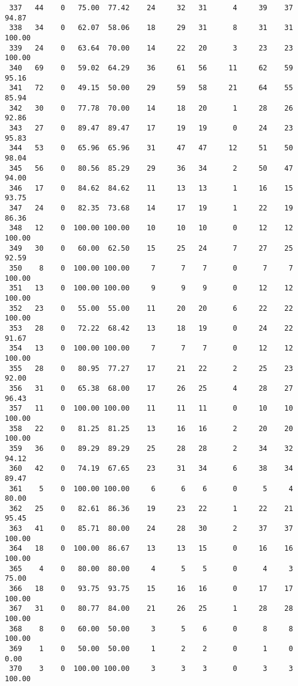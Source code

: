 \begin{verbatim}
 337   44    0   75.00  77.42    24     32   31      4     39    37    94.87
 338   34    0   62.07  58.06    18     29   31      8     31    31   100.00
 339   24    0   63.64  70.00    14     22   20      3     23    23   100.00
 340   69    0   59.02  64.29    36     61   56     11     62    59    95.16
 341   72    0   49.15  50.00    29     59   58     21     64    55    85.94
 342   30    0   77.78  70.00    14     18   20      1     28    26    92.86
 343   27    0   89.47  89.47    17     19   19      0     24    23    95.83
 344   53    0   65.96  65.96    31     47   47     12     51    50    98.04
 345   56    0   80.56  85.29    29     36   34      2     50    47    94.00
 346   17    0   84.62  84.62    11     13   13      1     16    15    93.75
 347   24    0   82.35  73.68    14     17   19      1     22    19    86.36
 348   12    0  100.00 100.00    10     10   10      0     12    12   100.00
 349   30    0   60.00  62.50    15     25   24      7     27    25    92.59
 350    8    0  100.00 100.00     7      7    7      0      7     7   100.00
 351   13    0  100.00 100.00     9      9    9      0     12    12   100.00
 352   23    0   55.00  55.00    11     20   20      6     22    22   100.00
 353   28    0   72.22  68.42    13     18   19      0     24    22    91.67
 354   13    0  100.00 100.00     7      7    7      0     12    12   100.00
 355   28    0   80.95  77.27    17     21   22      2     25    23    92.00
 356   31    0   65.38  68.00    17     26   25      4     28    27    96.43
 357   11    0  100.00 100.00    11     11   11      0     10    10   100.00
 358   22    0   81.25  81.25    13     16   16      2     20    20   100.00
 359   36    0   89.29  89.29    25     28   28      2     34    32    94.12
 360   42    0   74.19  67.65    23     31   34      6     38    34    89.47
 361    5    0  100.00 100.00     6      6    6      0      5     4    80.00
 362   25    0   82.61  86.36    19     23   22      1     22    21    95.45
 363   41    0   85.71  80.00    24     28   30      2     37    37   100.00
 364   18    0  100.00  86.67    13     13   15      0     16    16   100.00
 365    4    0   80.00  80.00     4      5    5      0      4     3    75.00
 366   18    0   93.75  93.75    15     16   16      0     17    17   100.00
 367   31    0   80.77  84.00    21     26   25      1     28    28   100.00
 368    8    0   60.00  50.00     3      5    6      0      8     8   100.00
 369    1    0   50.00  50.00     1      2    2      0      1     0     0.00
 370    3    0  100.00 100.00     3      3    3      0      3     3   100.00

\end{verbatim}
